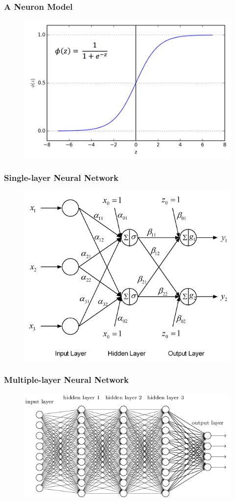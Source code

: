 \documentclass{beamer}
\begin{document}
\begin{frame}
	\frametitle{A Neuron Model}
	\begin{figure}
		\includegraphics[width=0.8\linewidth]{sigmoid.png}
	\end{figure}
\end{frame}

\begin{frame}
	\frametitle{Single-layer Neural Network}
	\begin{figure}
		\includegraphics[width=0.8\linewidth]{singlelayer_network1.png}
	\end{figure}
\end{frame}

\begin{frame}
	\frametitle{Multiple-layer Neural Network}
	\begin{figure}
		\includegraphics[width=0.8\linewidth]{multilayer_network.png}
	\end{figure}
\end{frame}
\end{document}
